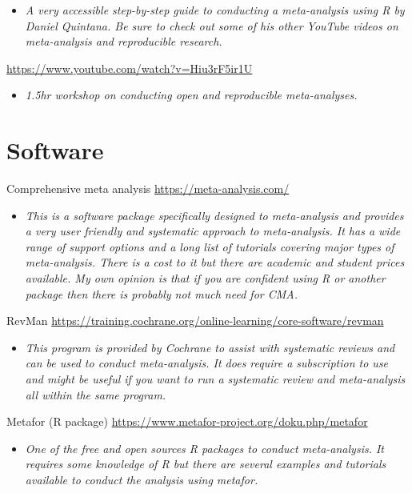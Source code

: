 \documentclass[
]{book}
\providecommand{\tightlist}{%
  \setlength{\itemsep}{0pt}\setlength{\parskip}{0pt}}
\begin{document}
\begin{itemize}
\tightlist
\item
  \emph{A very accessible step-by-step guide to conducting a meta-analysis using R by Daniel Quintana. Be sure to check out some of his other YouTube videos on meta-analysis and reproducible research. }
\end{itemize}

\url{https://www.youtube.com/watch?v=Hiu3rF5ir1U}

\begin{itemize}
\tightlist
\item
  \emph{1.5hr workshop on conducting open and reproducible meta-analyses.}
\end{itemize}

\hypertarget{software}{%
\section{Software}\label{software}}

Comprehensive meta analysis \url{https://meta-analysis.com/}

\begin{itemize}
\tightlist
\item
  \emph{This is a software package specifically designed to meta-analysis and provides a very user friendly and systematic approach to meta-analysis. It has a wide range of support options and a long list of tutorials covering major types of meta-analysis. There is a cost to it but there are academic and student prices available. My own opinion is that if you are confident using R or another package then there is probably not much need for CMA. }
\end{itemize}

RevMan \url{https://training.cochrane.org/online-learning/core-software/revman}

\begin{itemize}
\tightlist
\item
  \emph{This program is provided by Cochrane to assist with systematic reviews and can be used to conduct meta-analysis. It does require a subscription to use and might be useful if you want to run a systematic review and meta-analysis all within the same program.}
\end{itemize}

Metafor (R package) \url{https://www.metafor-project.org/doku.php/metafor}

\begin{itemize}
\tightlist
\item
  \emph{One of the free and open sources R packages to conduct meta-analysis. It requires some knowledge of R but there are several examples and tutorials available to conduct the analysis using metafor.}
\end{itemize}
\end{document}
